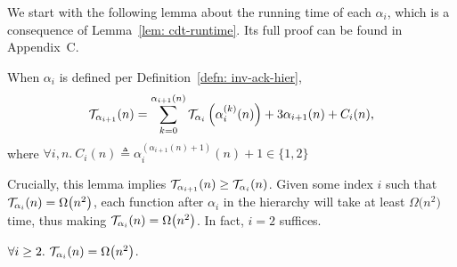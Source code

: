 \noindent We start with the following lemma about the running time of each $\alpha_i$, which is a consequence of Lemma~\ref{lem: cdt-runtime}. Its full proof can be found in 
Appendix~C. 
\begin{lem} \label{lem: inv-ack-hier-runtime}
	When $\alpha_i$ is defined per Definition~\ref{defn: inv-ack-hier},
	\begin{equation*}
	\mathcal{T}_{\alpha_{i+1}}(n) = \sum_{k=0}^{\alpha_{i+1}(n)}\mathcal{T}_{\alpha_i}\left( \alpha_i^{(k)}(n)\right) + 3\alpha_{i+1}(n) + C_i(n),
	\end{equation*}
	where $\forall i, n.~C_i(n) \triangleq \alpha_i^{(\alpha_{i+1}(n) + 1)}(n) + 1 \in \{1, 2\}$
\end{lem}
\noindent Crucially, this lemma implies $\mathcal{T}_{\alpha_{i+1}}(n) \ge 
\mathcal{T}_{\alpha_i}(n)$. 
Given some index $i$ such that $\mathcal{T}_{\alpha_i}(n) = \Omega\big(n^2\big)$, each function after $\alpha_i$ in the hierarchy will take at least $\Omega\big(n^2\big)$ time, thus making \lb $\mathcal{T}_{\alpha_i} (n) = \Omega\big(n^2\big)$.
In fact, $i = 2$ suffices.
\begin{lem} \label{lem: alpha2_runtime_naive}
	$\forall i\ge 2.~\mathcal{T}_{\alpha_i}(n) = \Omega\big(n^2\big)$.
\end{lem}


